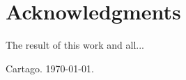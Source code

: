 \chapter*{Acknowledgments}
\thispagestyle{empty}

The result of this work and all...

\vspace*{1cm}

\scriptAuthor

Cartago. {\today}.

\cleardoublepage

